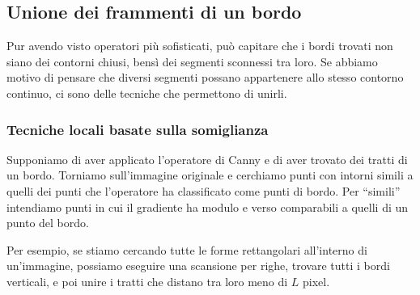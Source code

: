 \documentclass[a4paper,11pt]{article}
\begin{document}
\subsection{Unione dei frammenti di un bordo}
Pur avendo visto operatori più sofisticati, può capitare che i bordi trovati non siano dei contorni chiusi, bensì dei segmenti sconnessi tra loro.
Se abbiamo motivo di pensare che diversi segmenti possano appartenere allo stesso contorno continuo, ci sono delle tecniche che permettono di unirli.

\subsubsection{Tecniche locali basate sulla somiglianza}
Supponiamo di aver applicato l'operatore di Canny e di aver trovato dei tratti di un bordo. Torniamo sull'immagine originale e cerchiamo punti con intorni
simili a quelli dei punti che l'operatore ha classificato come punti di bordo. Per ``simili'' intendiamo punti in cui il gradiente ha modulo
e verso comparabili a quelli di un punto del bordo.
\par
Per esempio, se stiamo cercando tutte le forme rettangolari all'interno di un'immagine, possiamo eseguire una scansione per righe,
trovare tutti i bordi verticali, e poi unire i tratti che distano tra loro meno di $L$ pixel.
\end{document}

